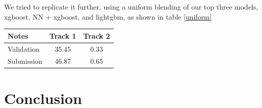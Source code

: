 \documentclass[a4paper, 12pt]{article}
\begin{document}
\begin{multicols}{2}
                We tried to replicate it further, using a uniform blending of our top three models, xgboost, NN + xgboost, and lightgbm, as shown in table \ref {uniform}
                \begin{center}
                    \begin{tabular}{l|cc}
                        Notes & Track 1 & Track 2 \\
                        \hline
                        Validation & 35.45 & 0.33 \\
                        Submission & 46.87 & 0.65
                    \end{tabular}
                    \label{uniform}
                \end{center}
        \section{Conclusion}

  \end{multicols}

\vskip 5cm
{}

\end{document}
